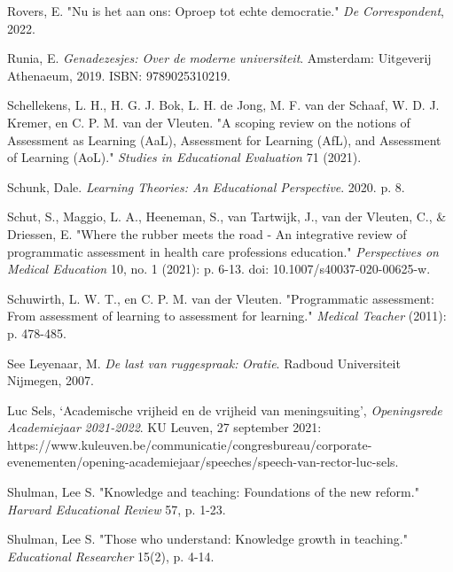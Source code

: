 \documentclass[smallauthor, chapterhaspagenum, nochapterinheader, pagenuminheader,  bigchapnum,medium2, tocpages,  garamond, titleinheader]{jote-book}
\begin{document}
\begin{references}
		Rovers, E. "Nu is het aan ons: Oproep tot echte democratie." \emph{De Correspondent}, 2022.



		Runia, E. \emph{Genadezesjes}\emph{: Over de }\emph{moderne}\emph{ }\emph{universiteit}. Amsterdam: Uitgeverij Athenaeum, 2019. ISBN: 9789025310219.



		Schellekens, L. H., H. G. J. Bok, L. H. de Jong, M. F. van der Schaaf, W. D. J. Kremer, en C. P. M. van der Vleuten. "A scoping review on the notions of Assessment as Learning (AaL), Assessment for Learning (AfL), and Assessment of Learning (AoL)." \emph{Studies in Educational Evaluation} 71 (2021).



		Schunk, Dale. \emph{Learning Theories: An Educational Perspective}. 2020. p. 8.



		Schut, S., Maggio, L. A., Heeneman, S., van Tartwijk, J., van der Vleuten, C., \& Driessen, E. "Where the rubber meets the road - An integrative review of programmatic assessment in health care professions education." \emph{Perspectives on Medical Education} 10, no. 1 (2021): p. 6-13. doi: 10.1007/s40037-020-00625-w.



		Schuwirth, L. W. T., en C. P. M. van der Vleuten. "Programmatic assessment: From assessment of learning to assessment for learning." \emph{Medical Teacher} (2011): p. 478-485.



		See Leyenaar, M. \emph{De last van }\emph{ruggespraak}\emph{: }\emph{Oratie}. Radboud Universiteit Nijmegen, 2007.



		Luc Sels, ‘Academische vrijheid en de vrijheid van meningsuiting', \emph{Openingsrede}\emph{ }\emph{Academiejaar}\emph{ 2021-2022}. KU Leuven, 27 september 2021: https://www.kuleuven.be/communicatie/congresbureau/corporate-evenementen/opening-academiejaar/speeches/speech-van-rector-luc-sels.



		Shulman, Lee S. "Knowledge and teaching: Foundations of the new reform." \emph{Harvard Educational Review} 57, p. 1-23.



		Shulman, Lee S. "Those who understand: Knowledge growth in teaching." \emph{Educational Researcher} 15(2), p. 4-14.




\end{references}
\end{document}
